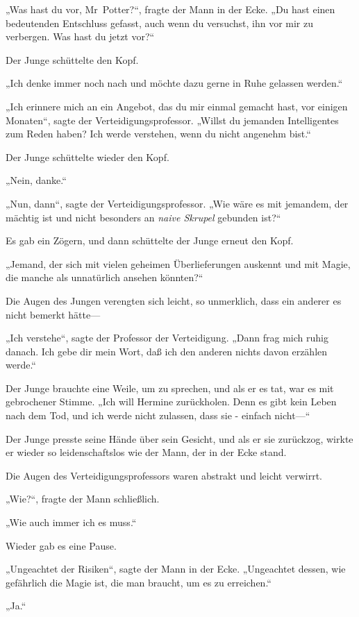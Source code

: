 {„Was hast du vor, Mr~Potter?“, fragte der Mann in der Ecke. „Du hast einen bedeutenden Entschluss gefasst, auch wenn du versuchst, ihn vor mir zu verbergen. Was hast du jetzt vor?“

Der Junge schüttelte den Kopf.

„Ich denke immer noch nach und möchte dazu gerne in Ruhe gelassen werden.“

„Ich erinnere mich an ein Angebot, das du mir einmal gemacht hast, vor einigen Monaten“, sagte der Verteidigungsprofessor. „Willst du jemanden Intelligentes zum Reden haben? Ich werde verstehen, wenn du nicht angenehm bist.“

Der Junge schüttelte wieder den Kopf.

„Nein, danke.“

„Nun, dann“, sagte der Verteidigungsprofessor. „Wie wäre es mit jemandem, der mächtig ist und nicht besonders an \emph{naive Skrupel} gebunden ist?“

Es gab ein Zögern, und dann schüttelte der Junge erneut den Kopf.

„Jemand, der sich mit vielen geheimen Überlieferungen auskennt und mit Magie, die manche als unnatürlich ansehen könnten?“

Die Augen des Jungen verengten sich leicht, so unmerklich, dass ein anderer es nicht bemerkt hätte—

„Ich verstehe“, sagte der Professor der Verteidigung. „Dann frag mich ruhig danach. Ich gebe dir mein Wort, daß ich den anderen nichts davon erzählen werde.“

Der Junge brauchte eine Weile, um zu sprechen, und als er es tat, war es mit gebrochener Stimme. „Ich will Hermine zurückholen. Denn es gibt kein Leben nach dem Tod, und ich werde nicht zulassen, dass sie - einfach nicht—“

Der Junge presste seine Hände über sein Gesicht, und als er sie zurückzog, wirkte er wieder so leidenschaftslos wie der Mann, der in der Ecke stand.

Die Augen des Verteidigungsprofessors waren abstrakt und leicht verwirrt.

„Wie?“, fragte der Mann schließlich.

„Wie auch immer ich es muss.“

Wieder gab es eine Pause.

„Ungeachtet der Risiken“, sagte der Mann in der Ecke. „Ungeachtet dessen, wie gefährlich die Magie ist, die man braucht, um es zu erreichen.“

„Ja.“

}
